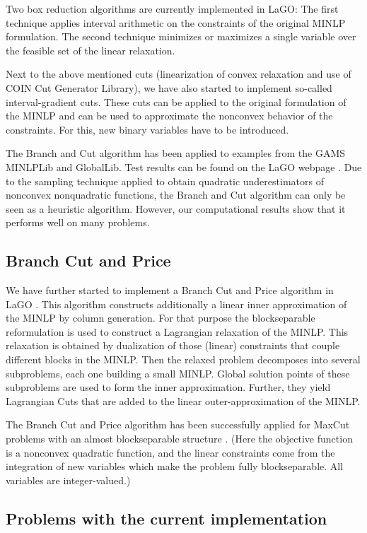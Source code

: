 \documentclass[11pt]{article}
\begin{document}
Two box reduction algorithms are currently implemented in LaGO:
The first technique applies interval arithmetic on the constraints of the original MINLP formulation.
The second technique minimizes or maximizes a single variable over the feasible set of the linear relaxation.

Next to the above mentioned cuts (linearization of convex relaxation and use of COIN Cut Generator Library), we have also started to implement so-called interval-gradient cuts. These cuts can be applied to the original formulation of the MINLP and can be used to approximate the nonconvex behavior of the constraints. For this, new binary variables have to be introduced.

The Branch and Cut algorithm has been applied to examples from the GAMS MINLPLib and GlobalLib.
Test results can be found on the LaGO webpage \cite{lago}.
Due to the sampling technique applied to obtain quadratic underestimators of nonconvex nonquadratic functions, the Branch and Cut algorithm can only be seen as a heuristic algorithm.
However, our computational results show that it performs well on many problems.

\subsection{Branch Cut and Price}

We have further started to implement a Branch Cut and Price algorithm in LaGO \cite{No05}.
This algorithm constructs additionally a linear inner approximation of the MINLP by column generation.
For that purpose the blockseparable reformulation is used to construct a Lagrangian relaxation of the MINLP.
This relaxation is obtained by dualization of those (linear) constraints that couple different blocks in the MINLP.
Then the relaxed problem decomposes into several subproblems, each one building a small MINLP.
Global solution points of these subproblems are used to form the inner approximation.
Further, they yield Lagrangian Cuts that are added to the linear outer-approximation of the MINLP.

The Branch Cut and Price algorithm has been successfully applied for MaxCut problems with an almost blockseparable structure \cite{No05}.
(Here the objective function is a nonconvex quadratic function, and the linear constraints come from the integration of new variables which make the problem fully blockseparable. All variables are integer-valued.)

\subsection{Problems with the current implementation}
\end{document}
